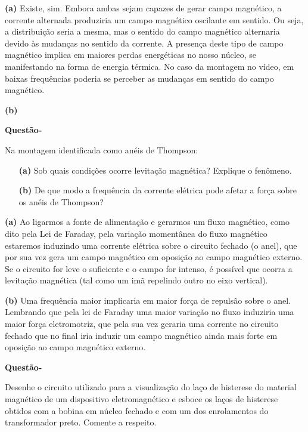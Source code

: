\documentclass[12pt, a4paper, notitlepage]{article}
\newcounter{counterquestions}
\newenvironment{questions}{
    \noindent
    \stepcounter{counterquestions}
    \textbf{Questão\:\thecounterquestions\:-}
    \noindent
}{
    \noindent
}
\begin{document}
        \textbf{(a)} Existe, sim. Embora ambas sejam capazes de gerar campo magnético, a corrente alternada produziria um campo magnético oscilante em sentido. Ou seja, a distribuição seria a mesma, mas o sentido do campo magnético alternaria devido às mudanças no sentido da corrente. A presença deste tipo de campo magnético implica em maiores perdas energéticas no nosso núcleo, se manifestando na forma de energia térmica. No caso da montagem no vídeo, em baixas frequências poderia se perceber as mudanças em sentido do campo magnético.
        
        \textbf{(b)} 
        
        \begin{questions}
            Na montagem identificada como anéis de Thompson:
            \begin{itemize}[noitemsep,topsep=0pt]
                \item[\textbf{(a)}]{Sob quais condições ocorre levitação magnética? Explique o fenômeno.}
                \item[\textbf{(b)}]{De que modo a frequência da corrente elétrica pode afetar a força sobre os anéis de Thompson?}
            \end{itemize}
        \end{questions}
        
        \textbf{(a)} Ao ligarmos a fonte de alimentação e gerarmos um fluxo magnético, como dito pela Lei de Faraday, pela variação momentânea do fluxo magnético estaremos induzindo uma corrente elétrica sobre o circuito fechado (o anel), que por sua vez gera um campo magnético em oposição ao campo magnético externo. Se o circuito for leve o suficiente e o campo for intenso, é possível que ocorra a levitação magnética (tal como um imã repelindo outro no eixo vertical).
        
        \textbf{(b)} Uma frequência maior implicaria em maior força de repulsão sobre o anel. Lembrando que pela lei de Faraday uma maior variação no fluxo induziria uma maior força eletromotriz, que pela sua vez geraria uma corrente no circuito fechado que no final iria induzir um campo magnético ainda mais forte em oposição ao campo magnético externo.
        
        \begin{questions}
            Desenhe o circuito utilizado para a visualização do laço de histerese do material magnético de um dispositivo eletromagnético e esboce os laços de histerese obtidos com a bobina em núcleo fechado e com um dos enrolamentos do transformador preto. Comente a respeito.
        \end{questions}
        
\end{document}
